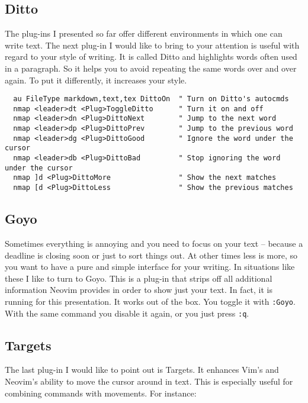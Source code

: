 \documentclass[DIV=calc, a4paper, fontsize=12pt, headings=normal, parskip=half]{scrartcl}
\begin{document}
\subsection{Ditto}\label{ditto}

The plug-ins I presented so far offer different environments in which
one can write text. The next plug-in I would like to bring to your
attention is useful with regard to your style of writing. It is called
Ditto and highlights words often used in a paragraph. So it helps you to
avoid repeating the same words over and over again. To put it
differently, it increases your style.

\begin{singlespace}
  \begin{verbatim}
  au FileType markdown,text,tex DittoOn  " Turn on Ditto's autocmds
  nmap <leader>dt <Plug>ToggleDitto      " Turn it on and off
  nmap <leader>dn <Plug>DittoNext        " Jump to the next word
  nmap <leader>dp <Plug>DittoPrev        " Jump to the previous word
  nmap <leader>dg <Plug>DittoGood        " Ignore the word under the cursor
  nmap <leader>db <Plug>DittoBad         " Stop ignoring the word under the cursor
  nmap ]d <Plug>DittoMore                " Show the next matches
  nmap [d <Plug>DittoLess                " Show the previous matches
  \end{verbatim}
\end{singlespace}

\subsection{Goyo}\label{goyo}

Sometimes everything is annoying and you need to focus on your text --
because a deadline is closing soon or just to sort things out. At other
times less is more, so you want to have a pure and simple interface for
your writing. In situations like these I like to turn to Goyo. This is a
plug-in that strips off all additional information Neovim provides in
order to show just your text. In fact, it is running for this
presentation. It works out of the box. You toggle it with
\texttt{:Goyo}. With the same command you disable it again, or you just
press \texttt{:q}.

\subsection{Targets}\label{targets}

The last plug-in I would like to point out is Targets. It enhances Vim's
and Neovim's ability to move the cursor around in text. This is
especially useful for combining commands with movements. For instance:
\end{document}
